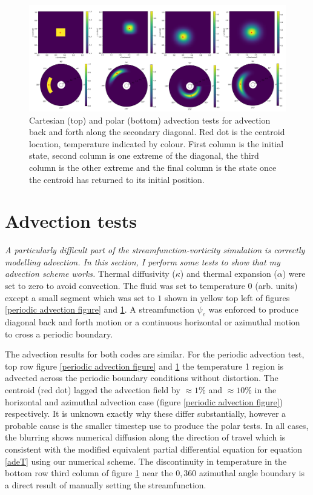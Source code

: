 \documentclass{article}
\begin{document}
\begin{figure}
	\center
	\includegraphics[scale=1.20]{combinedDiagonal.png}
	\caption{Cartesian (top) and polar (bottom) advection tests for advection back and forth along the secondary diagonal. Red dot is the centroid location, temperature indicated by colour. First column is the initial state, second column is one extreme of the diagonal, the third column is the other extreme and the final column is the state once the centroid has returned to its initial position.}
	\label{diagonal advection figure}
\end{figure}

\newpage
\section*{Advection tests}
{\it{A particularly difficult part of the streamfunction-vorticity simulation is correctly modelling advection. In this section, I perform some tests to show that my advection scheme works.}}
\vspace{0.3cm}
\newline
\noindent Thermal diffusivity ($\kappa$) and thermal expansion ($\alpha$) were set to zero to avoid convection. The fluid was set to temperature 0 (arb. units) except a small segment which was set to $1$ shown in yellow top left of figures \ref{periodic advection figure} and \ref{diagonal advection figure}. A streamfunction $\psi_c$ was enforced to produce diagonal back and forth motion or a continuous horizontal or azimuthal motion to cross a periodic boundary.




\noindent The advection results for both codes are similar. For the periodic advection test, top row figure \ref{periodic advection figure} and \ref{diagonal advection figure} the temperature 1 region is advected across the periodic boundary conditions without distortion. The centroid (red dot) lagged the advection field by $\approx 1 \%$ and $\approx 10 \%$ in the horizontal and azimuthal advection case (figure \ref{periodic advection figure}) respectively. It is unknown exactly why these differ substantially, however a probable cause is the smaller timestep use to produce the polar tests. In all cases, the blurring shows numerical diffusion along the direction of travel which is consistent with the modified equivalent partial differential equation for equation \ref{adeT} using our numerical scheme. The discontinuity in temperature in the bottom row third column of figure \ref{diagonal advection figure} near the $0, 360$ azimuthal angle boundary is a direct result of manually setting the streamfunction.
\end{document}
